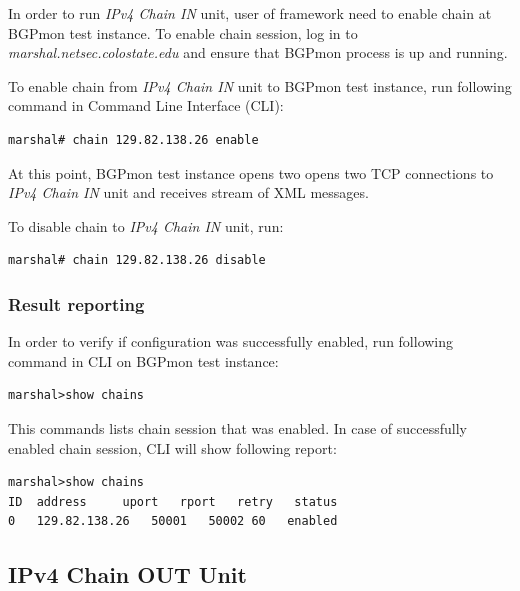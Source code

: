 In order to run \emph{IPv4 Chain IN} unit, user of framework need to enable chain  at BGPmon  test instance. To enable chain session, log in to \emph{marshal.netsec.colostate.edu} and ensure that BGPmon process is up and running.  

To enable chain from \emph{IPv4 Chain IN} unit to  BGPmon test instance, run following command in Command Line Interface (CLI):

\begin{verbatim}
marshal# chain 129.82.138.26 enable
\end{verbatim}

At this point, BGPmon test instance opens two opens two TCP connections to \emph{IPv4 Chain IN} unit and receives stream of XML messages. 

To disable chain to \emph{IPv4 Chain IN} unit, run:

\begin{verbatim}
marshal# chain 129.82.138.26 disable
\end{verbatim}

\subsubsection{Result reporting}

In order to verify if configuration was successfully enabled, run following command in CLI on BGPmon test instance:

\begin{verbatim}
marshal>show chains
\end{verbatim}

This commands lists chain session that was enabled. In case of successfully enabled chain session,  CLI will show following report:

\begin{verbatim}
marshal>show chains
ID	address		uport	rport	retry	status
0	129.82.138.26	50001	50002 60   enabled
\end{verbatim}







\subsection{IPv4 Chain OUT Unit}

